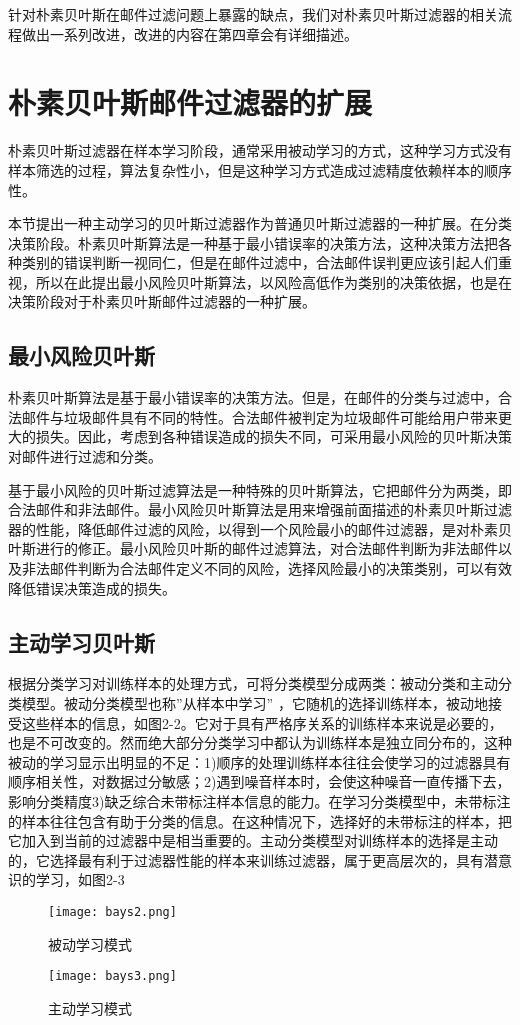 针对朴素贝叶斯在邮件过滤问题上暴露的缺点，我们对朴素贝叶斯过滤器的相关流程做出一系列改进，改进的内容在第四章会有详细描述。
\section{朴素贝叶斯邮件过滤器的扩展}
朴素贝叶斯过滤器在样本学习阶段，通常采用被动学习的方式，这种学习方式没有样本筛选的过程，算法复杂性小，但是这种学习方式造成过滤精度依赖样本的顺序性。

本节提出一种主动学习的贝叶斯过滤器作为普通贝叶斯过滤器的一种扩展。在分类决策阶段。朴素贝叶斯算法是一种基于最小错误率的决策方法，这种决策方法把各种类别的错误判断一视同仁，但是在邮件过滤中，合法邮件误判更应该引起人们重视，所以在此提出最小风险贝叶斯算法，以风险高低作为类别的决策依据，也是在决策阶段对于朴素贝叶斯邮件过滤器的一种扩展。
\subsection{最小风险贝叶斯}
朴素贝叶斯算法是基于最小错误率的决策方法。但是，在邮件的分类与过滤中，合法邮件与垃圾邮件具有不同的特性。合法邮件被判定为垃圾邮件可能给用户带来更大的损失。因此，考虑到各种错误造成的损失不同，可采用最小风险的贝叶斯决策对邮件进行过滤和分类。

基于最小风险的贝叶斯过滤算法是一种特殊的贝叶斯算法，它把邮件分为两类，即合法邮件和非法邮件。最小风险贝叶斯算法是用来增强前面描述的朴素贝叶斯过滤器的性能，降低邮件过滤的风险，以得到一个风险最小的邮件过滤器，是对朴素贝叶斯进行的修正。最小风险贝叶斯的邮件过滤算法，对合法邮件判断为非法邮件以及非法邮件判断为合法邮件定义不同的风险，选择风险最小的决策类别，可以有效降低错误决策造成的损失。
\subsection{主动学习贝叶斯}
根据分类学习对训练样本的处理方式，可将分类模型分成两类：被动分类和主动分类模型。被动分类模型也称”从样本中学习” ，它随机的选择训练样本，被动地接受这些样本的信息，如图2-2。它对于具有严格序关系的训练样本来说是必要的，也是不可改变的。然而绝大部分分类学习中都认为训练样本是独立同分布的，这种被动的学习显示出明显的不足：1)顺序的处理训练样本往往会使学习的过滤器具有顺序相关性，对数据过分敏感；2)遇到噪音样本时，会使这种噪音一直传播下去，影响分类精度3)缺乏综合未带标注样本信息的能力。在学习分类模型中，未带标注的样本往往包含有助于分类的信息。在这种情况下，选择好的未带标注的样本，把它加入到当前的过滤器中是相当重要的。主动分类模型对训练样本的选择是主动的，它选择最有利于过滤器性能的样本来训练过滤器，属于更高层次的，具有潜意识的学习，如图2-3
\begin{figure}[htbp]
\centering
\texttt{[image: bays2.png]}
\caption{被动学习模式}
\texttt{[image: bays3.png]}
\caption{主动学习模式}
\label{fig:logo}
\end{figure}

